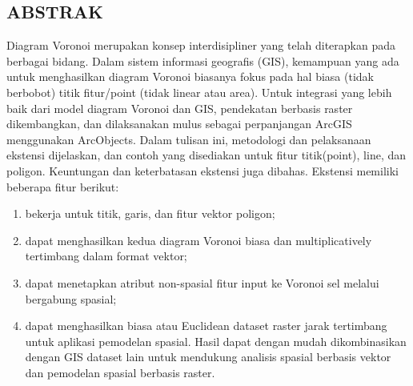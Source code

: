 \subsection{ABSTRAK}
Diagram  Voronoi merupakan konsep interdisipliner yang telah diterapkan pada berbagai bidang. Dalam sistem informasi geografis (GIS), kemampuan yang ada untuk menghasilkan diagram Voronoi biasanya fokus pada hal biasa (tidak berbobot) titik fitur/point (tidak linear atau area). Untuk integrasi yang lebih baik dari model diagram Voronoi dan GIS, pendekatan berbasis raster dikembangkan, dan dilaksanakan mulus sebagai perpanjangan ArcGIS menggunakan ArcObjects. Dalam tulisan ini, metodologi dan pelaksanaan ekstensi dijelaskan, dan contoh yang disediakan untuk fitur titik(point), line, dan poligon. Keuntungan dan keterbatasan ekstensi juga dibahas. Ekstensi memiliki beberapa fitur berikut: 
\begin{enumerate}
\item bekerja untuk titik, garis, dan fitur vektor poligon; 
\item dapat menghasilkan kedua diagram Voronoi biasa dan multiplicatively tertimbang dalam format vektor; 
\item dapat menetapkan atribut non-spasial fitur input ke Voronoi sel melalui bergabung spasial;
\item dapat menghasilkan biasa atau Euclidean dataset raster jarak tertimbang untuk aplikasi pemodelan spasial. Hasil dapat dengan mudah dikombinasikan dengan GIS dataset lain untuk mendukung analisis spasial berbasis vektor dan pemodelan spasial berbasis raster.
\end{enumerate}

